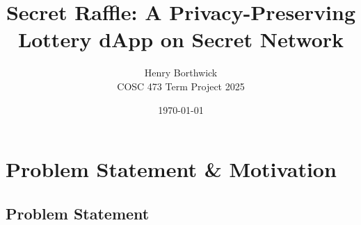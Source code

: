 \documentclass{article}
\title{Secret Raffle: A Privacy-Preserving Lottery dApp on Secret Network}
\author{Henry Borthwick \\ COSC 473 Term Project 2025}
\date{\today}
\begin{document}
\maketitle

\begin{abstract}

\end{abstract}

\section{Problem Statement \& Motivation}

\subsection{Problem Statement}
\end{document}
